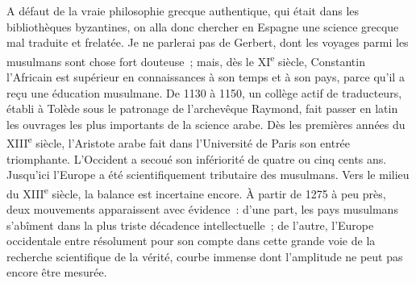 \documentclass[french,twoside]{book} %
\newcommand\orgName[1]{#1}
\newcommand\persName[1]{#1}
\newcommand\placeName[1]{#1}
\begin{document}
A défaut de la vraie philosophie grecque authentique, qui était dans les bibliothèques byzantines, on alla donc chercher en {\placeName Espagne} une science grecque mal traduite et frelatée. Je ne parlerai pas de {\persName Gerbert}, dont les voyages parmi les musulmans sont chose fort douteuse ; mais, dès le XI\textsuperscript{e} siècle, {\persName Constantin l’Africain} est supérieur en connaissances à son temps et à son pays, parce qu’il a reçu une éducation musulmane. De 1130 à 1150, un collège actif de traducteurs, établi à {\placeName Tolède} sous le patronage de l’{\persName archevêque Raymond}, fait passer en latin les ouvrages les plus importants de la science arabe. Dès les premières années du XIII\textsuperscript{e} siècle, l’{\persName Aristote} arabe fait dans l’{\orgName Université de Paris} son entrée triomphante. L’{\orgName Occident} a secoué son infériorité de quatre ou cinq cents ans. Jusqu’ici l’{\orgName Europe} a été scientifiquement tributaire des musulmans. Vers le milieu du XIII\textsuperscript{e} siècle, la balance est incertaine encore. À partir de 1275 à peu près, deux mouvements apparaissent avec évidence : d’une part, les pays musulmans s’abîment dans la plus triste décadence intellectuelle ; de l’autre, l’{\orgName Europe occidentale} entre résolument pour son compte dans cette grande voie de la recherche scientifique de la vérité, courbe immense dont l’amplitude ne peut pas encore être mesurée.\par
\end{document}
